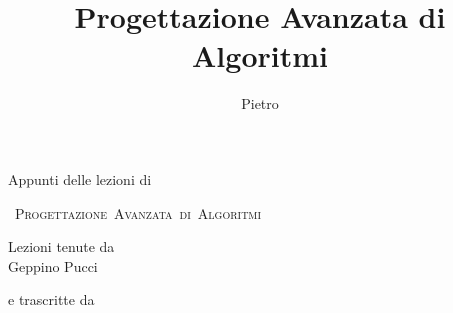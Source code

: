 \title{Progettazione Avanzata di Algoritmi}

\author{Pietro}

\makeatletter
\begin{titlepage}
	
	\begin{center}
		\vspace*{6cm}

		{\large
            Appunti delle lezioni di
        } 

		\vspace*{0.75cm}

        \centerline
        {
		{\LARGE
            \textsc{
                \mbox{
                    Progettazione Avanzata di Algoritmi
                }
            }
        } 
        }


        \vspace*{2.75cm}



        Lezioni tenute da
        \\
        Geppino Pucci

        \vspace*{0.5cm}

        e trascritte da
        \\
        \@author

    \end{center}

\end{titlepage}
\makeatother

